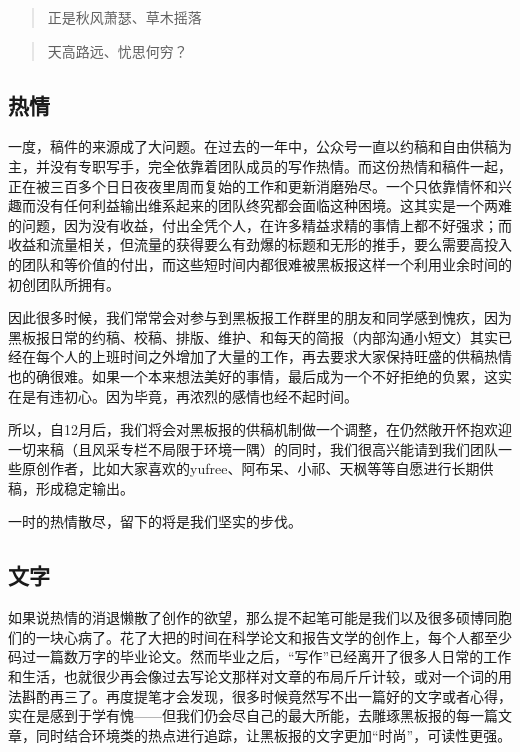 \documentclass[]{book}
\begin{document}
\begin{quote}
正是秋风萧瑟、草木摇落
\end{quote}

\begin{quote}
天高路远、忧思何穷？
\end{quote}

\hypertarget{ux70edux60c5}{%
\subsection{热情}\label{ux70edux60c5}}

一度，稿件的来源成了大问题。在过去的一年中，公众号一直以约稿和自由供稿为主，并没有专职写手，完全依靠着团队成员的写作热情。而这份热情和稿件一起，正在被三百多个日日夜夜里周而复始的工作和更新消磨殆尽。一个只依靠情怀和兴趣而没有任何利益输出维系起来的团队终究都会面临这种困境。这其实是一个两难的问题，因为没有收益，付出全凭个人，在许多精益求精的事情上都不好强求；而收益和流量相关，但流量的获得要么有劲爆的标题和无形的推手，要么需要高投入的团队和等价值的付出，而这些短时间内都很难被黑板报这样一个利用业余时间的初创团队所拥有。

因此很多时候，我们常常会对参与到黑板报工作群里的朋友和同学感到愧疚，因为黑板报日常的约稿、校稿、排版、维护、和每天的简报（内部沟通小短文）其实已经在每个人的上班时间之外增加了大量的工作，再去要求大家保持旺盛的供稿热情也的确很难。如果一个本来想法美好的事情，最后成为一个不好拒绝的负累，这实在是有违初心。因为毕竟，再浓烈的感情也经不起时间。

所以，自12月后，我们将会对黑板报的供稿机制做一个调整，在仍然敞开怀抱欢迎一切来稿（且风采专栏不局限于环境一隅）的同时，我们很高兴能请到我们团队一些原创作者，比如大家喜欢的yufree、阿布呆、小祁、天枫等等自愿进行长期供稿，形成稳定输出。

一时的热情散尽，留下的将是我们坚实的步伐。

\hypertarget{ux6587ux5b57}{%
\subsection{文字}\label{ux6587ux5b57}}

如果说热情的消退懒散了创作的欲望，那么提不起笔可能是我们以及很多硕博同胞们的一块心病了。花了大把的时间在科学论文和报告文学的创作上，每个人都至少码过一篇数万字的毕业论文。然而毕业之后，``写作''已经离开了很多人日常的工作和生活，也就很少再会像过去写论文那样对文章的布局斤斤计较，或对一个词的用法斟酌再三了。再度提笔才会发现，很多时候竟然写不出一篇好的文字或者心得，实在是感到于学有愧------但我们仍会尽自己的最大所能，去雕琢黑板报的每一篇文章，同时结合环境类的热点进行追踪，让黑板报的文字更加``时尚''，可读性更强。
\end{document}
